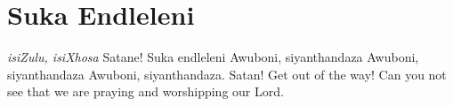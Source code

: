 \starttocol
\chapter{Suka Endleleni}
\nexttocol
\hfill{\it isiZulu, isiXhosa}
\stoptocol
\starttocol
\startlines
S{\sc atane!} Suka endleleni
Awuboni, siyanthandaza
Awuboni, siyanthandaza 
Awuboni, siyanthandaza.
\stoplines
\nexttocol
Satan! Get out of the way!
Can you not see that we are praying and worshipping our Lord.
\stoptocol

